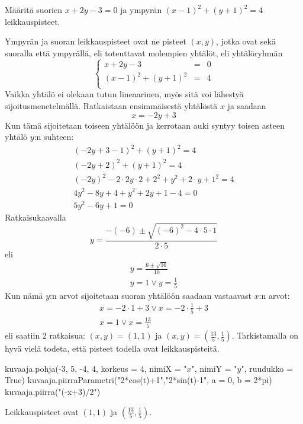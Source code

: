 \begin{esimerkki}
Määritä suorien $x+2y-3=0$ ja ympyrän $(x-1)^2+(y+1)^2=4 $ leikkauspisteet.

\begin{esimratk}

Ympyrän ja suoran leikkauspisteet ovat ne pisteet $(x, y)$, jotka ovat sekä suoralla että ympyrällä, eli toteuttavat molempien yhtälöt, eli yhtälöryhmän
$$\left\{    
    \begin{array}{rcl}
        x+2y-3 &=&0 \\
        (x-1)^2+(y+1)^2 &=&4 \\
    \end{array}
    \right.$$
Vaikka yhtälö ei olekaan tutun lineaarinen, myös sitä voi lähestyä sijoitusmenetelmällä. Ratkaistaan ensimmäisestä yhtälöstä $x$ ja saadaan
\[
x = -2y+3
\]
Kun tämä sijoitetaan toiseen yhtälöön ja kerrotaan auki syntyy toisen asteen yhtälö $y$:n suhteen:
\begin{align*}
(-2y+3-1)^2+(y+1)^2=4 \\
(-2y+2)^2+(y+1)^2=4 \\
(-2y)^2-2\cdot 2y\cdot 2 +2^2+y^2+2\cdot y+1^2=4 \\
4y^2-8y+4+y^2+2y+1-4 = 0 \\
5y^2-6y+1 = 0
\end{align*}
Ratkaisukaavalla
\[
y = \frac{-(-6)\pm\sqrt{(-6)^2-4\cdot 5\cdot 1}}{2\cdot5}
\]
eli
\begin{align*}
y = \frac{6\pm\sqrt{16}}{10} \\
y = 1 \vee y = \frac{1}{5}
\end{align*}
Kun nämä $y$:n arvot sijoitetaan suoran yhtälöön saadaan vastaavast $x$:n arvot:
\begin{align*}
x = -2\cdot 1+3 \vee x = -2\cdot\frac{1}{5}+3 \\
x = 1 \vee x = \frac{13}{5}
\end{align*}
eli saatiin 2 ratkaisua: $(x, y) = (1, 1)$ ja $(x, y) = (\frac{13}{5}, \frac{1}{5})$. Tarkistamalla on hyvä vielä todeta, että pisteet todella ovat leikkauspisteitä.

\begin{kuva}
    kuvaaja.pohja(-3, 5, -4, 4, korkeus = 4, nimiX = "$x$", nimiY = "$y$", ruudukko = True)
    kuvaaja.piirraParametri("2*cos(t)+1","2*sin(t)-1", a = 0, b = 2*pi)
    kuvaaja.piirra("(-x+3)/2")
	
\end{kuva}
\begin{esimvast}
Leikkauspisteet ovat $(1, 1)$ ja $(\frac{13}{5}, \frac{1}{5})$.
\end{esimvast}

\end{esimratk}
\end{esimerkki}

